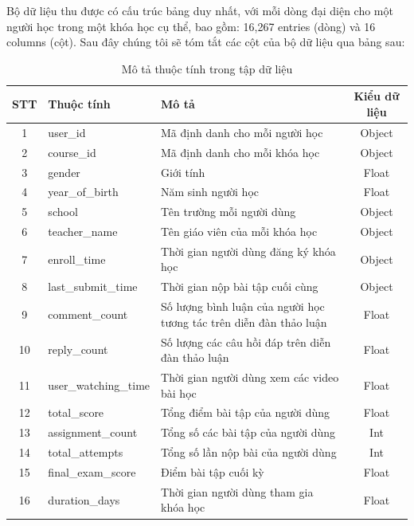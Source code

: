  Bộ dữ liệu thu được có cấu trúc bảng duy nhất, với mỗi dòng đại diện cho một người học trong một khóa học cụ thể, bao gồm: 16,267 entries (dòng) và 16 columns (cột). Sau đây chúng tôi sẽ tóm tắt các cột của bộ dữ liệu qua bảng sau:
\begin{table}[H]
\centering
\caption{Mô tả thuộc tính trong tập dữ liệu}
\label{tab:dataset_description}
\begin{tabular}{|c|l|p{7cm}|c|}
\hline
\textbf{STT} & \textbf{Thuộc tính} & \textbf{Mô tả} & \textbf{Kiểu dữ liệu} \\ \hline
1  & user\_id            & Mã định danh cho mỗi người học                                 & Object \\ \hline
2  & course\_id          & Mã định danh cho mỗi khóa học                                 & Object \\ \hline
3  & gender              & Giới tính                                                    & Float  \\ \hline
4  & year\_of\_birth      & Năm sinh người học                                           & Float  \\ \hline
5  & school              & Tên trường mỗi người dùng                                    & Object \\ \hline
6  & teacher\_name       & Tên giáo viên của mỗi khóa học                               & Object \\ \hline
7  & enroll\_time        & Thời gian người dùng đăng ký khóa học                       & Object \\ \hline
8  & last\_submit\_time   & Thời gian nộp bài tập cuối cùng                              & Object \\ \hline
9  & comment\_count      & Số lượng bình luận của người học tương tác trên diễn đàn thảo luận   & Float  \\ \hline
10 & reply\_count        & Số lượng các câu hồi đáp trên diễn đàn thảo luận            & Float  \\ \hline
11 & user\_watching\_time & Thời gian người dùng xem các video bài học                  & Float  \\ \hline
12 & total\_score        & Tổng điểm bài tập của người dùng                             & Float  \\ \hline
13 & assignment\_count   & Tổng số các bài tập của người dùng                           & Int    \\ \hline
14 & total\_attempts     & Tổng số lần nộp bài của người dùng                           & Int    \\ \hline
15 & final\_exam\_score   & Điểm bài tập cuối kỳ                                         & Float  \\ \hline
16 & duration\_days      & Thời gian người dùng tham gia khóa học                      & Float  \\ \hline
\end{tabular}
\end{table}

